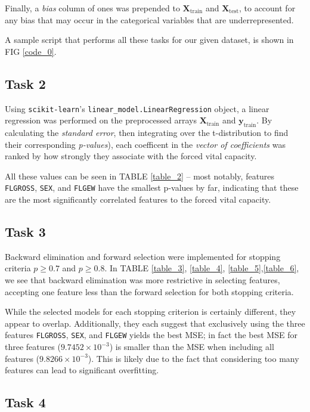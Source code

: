 \documentclass[twoside,twocolumn,10pt]{revtex4-1}
\begin{document}
	Finally, a \textit{bias} column of ones was prepended to $\mathbf{X}_\text{train}$ and $\mathbf{X}_\text{test}$, to account for any bias that may occur in the categorical variables that are underrepresented.
	
	A sample script that performs all these tasks for our given dataset, is shown in FIG \ref{code_0}.
	
	\subsection*{Task 2}
	
	Using \texttt{scikit-learn}'s \texttt{linear\_model.LinearRegression} object, a linear regression was performed on the preprocessed arrays $\mathbf{X}_\text{train}$ and $\mathbf{y}_\text{train}$.  By calculating the \textit{standard error}, then integrating over the t-distribution to find their corresponding \textit{p-values}), each coefficent in the \textit{vector of coefficients} was ranked by how strongly they associate with the forced vital capacity.  
	
	All these values can be seen in TABLE \ref{table_2} – most notably, features \texttt{FLGROSS}, \texttt{SEX}, and \texttt{FLGEW} have the smallest p-values by far, indicating that these are the most significantly correlated features to the forced vital capacity.	

	\subsection*{Task 3}
	
	Backward elimination and forward selection were implemented for stopping criteria $p \geq 0.7$ and $p \geq 0.8$.  In TABLE \ref{table_3}, \ref{table_4}, \ref{table_5},\ref{table_6}, we see that backward elimination was more restrictive in selecting features, accepting one feature less than the forward selection for both stopping criteria.
	
	While the selected models for each stopping criterion is certainly different, they appear to overlap. Additionally, they each suggest that exclusively using the three features \texttt{FLGROSS}, \texttt{SEX}, and \texttt{FLGEW} yields the best MSE; in fact the best MSE for three features ($9.7452 \times 10^{-3}$) is smaller than the MSE when including all features ($9.8266 \times 10^{-3}$).  This is likely due to the fact that considering too many features can lead to significant overfitting.

	\subsection*{Task 4}
	
\end{document}
